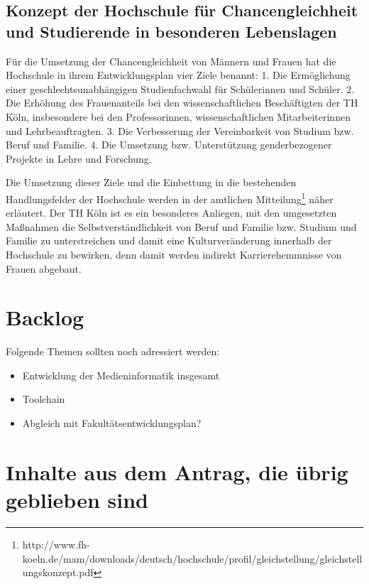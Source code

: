 \section{Konzept der Hochschule für Chancengleichheit und Studierende
in besonderen
Lebenslagen}\label{konzept-der-hochschule-fuxfcr-chancengleichheit-und-studierende-in-besonderen-lebenslagen}

Für die Umsetzung der Chancengleichheit von Männern und Frauen hat die
Hochschule in ihrem Entwicklungsplan vier Ziele benannt: 1. Die
Ermöglichung einer geschlechtsunabhängigen Studienfachwahl für
Schülerinnen und Schüler. 2. Die Erhöhung des Frauenanteils bei den
wissenschaftlichen Beschäftigten der TH Köln, insbesondere bei den
Professorinnen, wissenschaftlichen Mitarbeiterinnen und
Lehrbeauftragten. 3. Die Verbesserung der Vereinbarkeit von Studium bzw.
Beruf und Familie. 4. Die Umsetzung bzw. Unterstützung genderbezogener
Projekte in Lehre und Forschung.

Die Umsetzung dieser Ziele und die Einbettung in die bestehenden
Handlungsfelder der Hochschule werden in der amtlichen
Mitteilung\footnote{http://www.fh-koeln.de/mam/downloads/deutsch/hochschule/profil/gleichstellung/gleichstellungskonzept.pdf}
näher erläutert. Der TH Köln ist es ein besonderes Anliegen, mit den
umgesetzten Maßnahmen die Selbstverständlichkeit von Beruf und Familie
bzw. Studium und Familie zu unterstreichen und damit eine
Kulturveränderung innerhalb der Hochschule zu bewirken, denn damit
werden indirekt Karrierehemmnisse von Frauen abgebaut.

\chapter{Backlog}\label{backlog}

Folgende Themen sollten noch adressiert werden:

\begin{itemize}
\tightlist
\item
  Entwicklung der Medieninformatik insgesamt
\item
  Toolchain
\item
  Abgleich mit Fakultätsentwicklungsplan?
\end{itemize}

\chapter{Inhalte aus dem Antrag, die übrig geblieben
sind}\label{inhalte-aus-dem-antrag-die-uxfcbrig-geblieben-sind}

